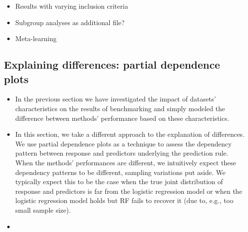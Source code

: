 \documentclass[12pt]{article}
\begin{document}
\begin{itemize}
\item Results with varying inclusion criteria
\item Subgroup analyses as additional file?
\item Meta-learning
\end{itemize}

\subsection{Explaining differences: partial dependence plots}
\begin{itemize}
\item In the previous section we have investigated the impact of datasets' characteristics on the results of benchmarking and simply modeled the difference between methods' performance based on these characteristics. 
\item In this section, we take a different approach to the explanation of differences. We use partial dependence plots as a technique to assess the dependency pattern between response and predictors underlying the prediction rule. When the methods' performances are different, we intuitively expect these dependency patterns to be different, sampling variations put aside. We typically expect this to be the case when the true joint distribution of response and predictors is far from the logistic regression model or when the logistic regression model holds but RF fails to recover it (due to, e.g., too small sample size). 
\item 
\end{itemize}
\end{document}
